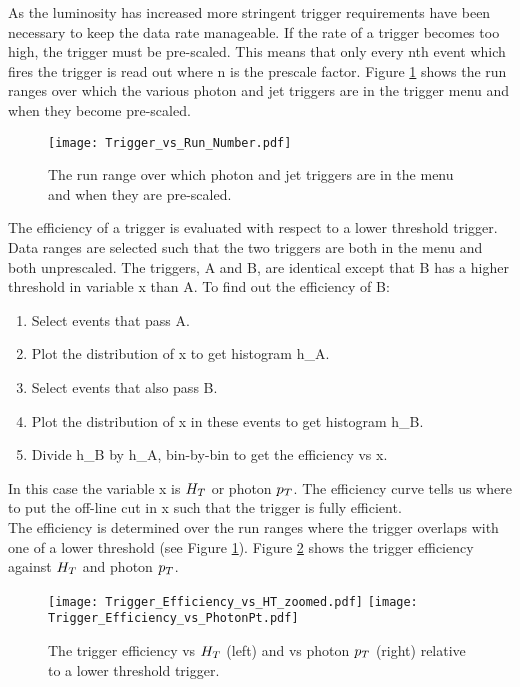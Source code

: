 As the luminosity has increased more stringent trigger requirements have been 
necessary to keep the data rate manageable. If the rate of a trigger becomes too
high, the trigger must be pre-scaled. This means that only every nth event which
fires the trigger is read out where n is the prescale factor. Figure 
\ref{fig:Trigger_vs_Run_Number} shows the run ranges over which the various 
photon and jet triggers are in the trigger menu and when they become pre-scaled.
\\

\begin{figure}
\begin{center}
\texttt{[image: Trigger\_vs\_Run\_Number.pdf]}
\end{center}
\caption{The run range over which photon and jet triggers are in the menu and
when they are pre-scaled.}
\label{fig:Trigger_vs_Run_Number}
\end{figure}

The efficiency of a trigger is evaluated with respect to a lower threshold
trigger. Data ranges are selected such that the two triggers are both in the
menu and both unprescaled. The triggers, A and B, are identical except that B 
has a higher threshold in variable x than A. To find out the efficiency of B:

\begin{enumerate}
\item Select events that pass A.
\item Plot the distribution of x to get histogram h\_A.
\item Select events that also pass B.
\item Plot the distribution of x in these events to get histogram h\_B.
\item Divide h\_B by h\_A, bin-by-bin to get the efficiency vs x.
\end{enumerate}

In this case the variable x is $H_{T}$ or photon $p_{T}$. The efficiency curve tells
us where to put the off-line cut in x such that the trigger is fully efficient.
\\

The efficiency is determined over the run ranges where the trigger overlaps with
one of a lower threshold (see Figure \ref{fig:Trigger_vs_Run_Number}). Figure 
\ref{fig:Trigger_Efficiency} shows the trigger efficiency against $H_{T}$ and 
photon $p_{T}$.

\begin{figure}
\texttt{[image: Trigger\_Efficiency\_vs\_HT\_zoomed.pdf]}
\texttt{[image: Trigger\_Efficiency\_vs\_PhotonPt.pdf]}
\caption{The trigger efficiency vs $H_{T}$ (left) and vs photon $p_{T}$ (right)
relative to a lower threshold trigger.}
\label{fig:Trigger_Efficiency}
\end{figure}

